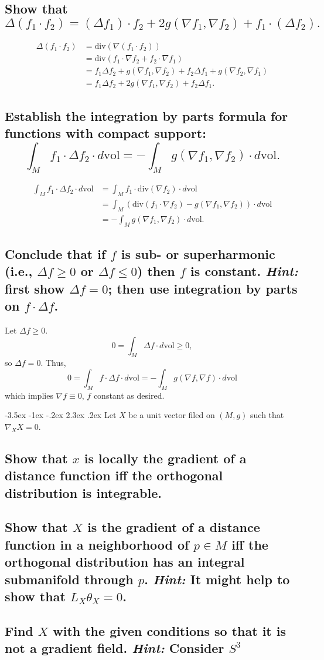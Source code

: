 \documentclass[10pt]{article}
\makeatletter
\renewcommand\section{\@startsection{section}{1}{\z@}%
                                  {-3.5ex \@plus -1ex \@minus -.2ex}%
                                  {2.3ex \@plus.2ex}%
                                  {\normalfont\large\bfseries}}
\newcommand{\vol}{{\mbox{vol}} }
\renewcommand{\div}{\mbox{div} }
\newcommand{\hint}[1]{{\emph{Hint:} #1}} %
\makeatother
\begin{document}
\subsection{Show that $$\Delta (f_1 \cdot f_2) = ( \Delta f_1) \cdot f_2 + 2 g (\nabla f_1, \nabla f_2) + f_1 \cdot (\Delta f_2).$$}
\begin{align*} \Delta(f_1 \cdot f_2) &= \div(\nabla( f_1 \cdot f_2)) \\ &= \div(f_1 \cdot \nabla f_2 + f_2 \cdot \nabla f_1) \\ &= f_1 \Delta f_2 + g( \nabla f_1, \nabla f_2) + f_2 \Delta f_1 + g(\nabla f_2, \nabla f_1) \\ &= f_1 \Delta f_2 + 2 g( \nabla f_1, \nabla f_2) + f_2 \Delta f_1. \end{align*}
\subsection{Establish the integration by parts formula for functions with compact support: $$\int_M f_1 \cdot \Delta f_2 \cdot d \vol = - \int_M g(\nabla f_1, \nabla f_2 ) \cdot d \vol.$$}
\begin{align*} \int_M f_1 \cdot \Delta f_2 \cdot d \vol &= \int_M f_1 \cdot \div (\nabla f_2 ) \cdot d \vol \\ &= \int_M(\div(f_1 \cdot \nabla f_2) - g(\nabla f_1, \nabla f_2)) \cdot d \vol \\ &= - \int_M g(\nabla f_1 , \nabla f_2) \cdot d \vol.\end{align*}
\subsection{Conclude that if $f$ is sub- or superharmonic (i.e., $\Delta f \geq 0$ or $\Delta f \leq 0$) then $f$ is constant. \hint{first show $\Delta f =0$; then use integration by parts on $f \cdot \Delta f$.}}
Let $\Delta f \geq 0$. 
\[ 0 = \int_M \Delta f \cdot d \vol \geq 0,\]
so $\Delta f = 0$. Thus,
\[0 = \int_M f \cdot \Delta f \cdot d \vol = - \int_M g( \nabla f, \nabla f) \cdot d \vol\]
which implies $\nabla f \equiv 0$, $f$ constant as desired. 

\section{Let $X$ be a unit vector filed on $(M,g)$ such that $\nabla_X X =0$.}
\subsection{Show that $x$ is locally the gradient of a distance function iff the orthogonal distribution is integrable.}
\subsection{Show that $X$ is the gradient of a distance function in a neighborhood of $p \in M$ iff the orthogonal distribution has an integral submanifold through $p$. \hint{It might help to show that $L_X \theta_X =0$.}}
\subsection{Find $X$ with the given conditions so that it is not a gradient field. \hint{Consider $S^3$}}
\end{document}
